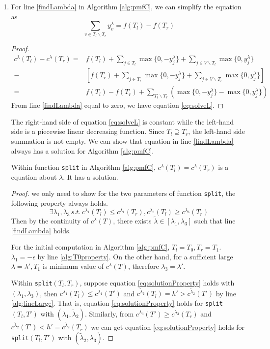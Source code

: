 \documentclass{article}
\begin{document}
\begin{enumerate}
\item For line \ref{findLambda} in  Algorithm \ref{alg:pmfC}, we can simplify the equation as
\begin{equation}\label{eq:solveL}
	\sum_{v\in T_l \backslash T_r} y^{\lambda}_v  = f(T_l)-f(T_r)
\end{equation}
\begin{proof}
	\begin{align*}
	c^{\lambda}(T_l) -
	c^{\lambda}(T_r)  =& f(T_l) + \sum_{j \in T_l} \max\{0, -y^{\lambda}_j\} + \sum_{j \in V\backslash T_l} \max\{0, y^{\lambda}_j\} \\
	-& [f(T_r) + \sum_{j \in T_r} \max\{0, -y^{\lambda}_j\} + \sum_{j \in V\backslash T_r} \max\{0, y^{\lambda}_j\}] \\
	= & f(T_l) - f(T_r) + \sum_{T_l \backslash T_r} (\max\{0, -y^{\lambda}_j\} - \max\{0, y^{\lambda}_j\} )
	\end{align*}
	From line \ref{findLambda} equal to zero, we have equation \eqref{eq:solveL}.
\end{proof}
The right-hand side of equation \eqref{eq:solveL} is constant while the left-hand side is a piecewise linear decreasing function. Since $T_l \supseteq T_r$, the left-hand side summation is not empty. We can show that equation in line \ref{findLambda} always has a solution for Algorithm \ref{alg:pmfC}.
\begin{lemma}
	Within function \texttt{split} in Algorithm \ref{alg:pmfC}, $c^{\lambda}(T_l) = c^{\lambda}(T_r)$ is a equation about $\lambda$. It has a solution.
\end{lemma}
\begin{proof}
	we only need to show for the two parameters of function \texttt{split}, the following property always holds.
\begin{equation}\label{eq:solutionProperty}
\exists \lambda_1, \lambda_3 \,s.t.\, c^{\lambda_1}(T_l) \leq c^{\lambda_1}(T_r), c^{\lambda_3}(T_l) \geq c^{\lambda_3}(T_r)
\end{equation}
Then by the continuity of $c^{\lambda}(T)$, there exists $\tilde{\lambda} \in [\lambda_1, \lambda_3]$ such that line \eqref{findLambda} holds.

For the initial computation in Algorithm \ref{alg:pmfC},
	$T_l = T_0, T_r = T_1$. $\lambda_1 = -\epsilon$ by line \ref{alg:T0property}. On the other hand, for a sufficient large $\lambda=\lambda', T_1$ is minimum value of $c^{\lambda}(T)$, therefore $\lambda_3 = \lambda'$. 

Within \texttt{split}$(T_l, T_r)$, suppose equation \eqref{eq:solutionProperty} holds with $(\lambda_1, \lambda_3)$, then 
$c^{\lambda_1}(T_l) \leq c^{\lambda_1}(T')$ and $c^{\tilde{\lambda}_2}(T_l) = h' > c^{\tilde{\lambda}_2}(T')$ by line \ref{alg:lineLarge}. That is, equation \eqref{eq:solutionProperty} holds for \texttt{split}$(T_l, T')$ with $(\lambda_1, \tilde{\lambda}_2)$. Similarly, from $c^{\lambda_3}(T') \geq c^{\lambda_3}(T_r)$ and $c^{\tilde{\lambda}_2}(T') < h' = c^{\tilde{\lambda}_2}(T_r)$ we can get  equation \eqref{eq:solutionProperty} holds for \texttt{split}$(T_l, T')$ with $(\tilde{\lambda}_2, \lambda_3)$.


\end{proof}
\end{enumerate}
\end{document}
